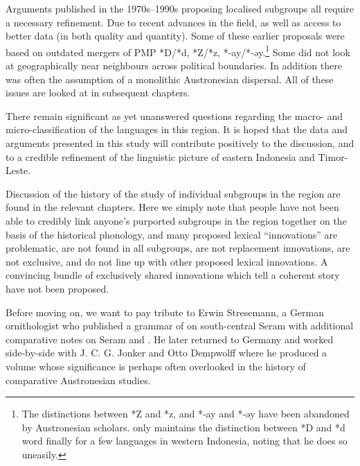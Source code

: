 {Arguments published in the 1970s--1990s proposing localised
subgroups all require a necessary refinement.
Due to recent advances in the field,
as well as access to better data (in both quality and quantity).
Some of these earlier proposals were based on outdated mergers
of PMP *D/*d, *Z/*z, *-ay/*-əy.\footnote{
		The distinctions between *Z
		and *z, and *-ay and *-əy have been abandoned by Austronesian scholars.
		\citet[582--584]{Blust2013} only maintains the distinction between *D
		and *d word finally for a few languages in western Indonesia,
		noting that he does so uneasily.}
Some did not look at geographically near neighbours across political boundaries.
In addition there was often the assumption of a monolithic Austronesian dispersal.
All of these issues are looked at in subsequent chapters.

There remain significant as yet unanswered questions
regarding the macro- and micro-classification of the languages in this region.
It is hoped that the data
and arguments presented in this study will contribute positively to the discussion,
and to a credible refinement of the linguistic picture of eastern Indonesia
and Timor-Leste.

Discussion of the history of the study of individual subgroups
in the region are found in the relevant chapters.
Here we simply note that people have not been able to credibly
link anyone’s purported subgroups in the region together
on the basis of the historical phonology,
and many proposed lexical “innovations” are problematic,
are not found in all subgroups,
are not replacement innovations, are not exclusive,
and do not line up with other proposed lexical innovations.
A convincing bundle of exclusively shared innovations
which tell a coherent story have not been proposed.

Before moving on,
we want to pay tribute to Erwin Stresemann,
a German ornithologist who published a grammar of 
on south-central Seram \citep{Stresemann1918} with additional
comparative notes on Seram and .
He later returned to Germany
and worked side-by-side with J. C. G. Jonker
and Otto Dempwolff where he produced a volume
\citet{Stresemann1927} whose significance is perhaps often overlooked
in the history of comparative Austronesian studies.

}
